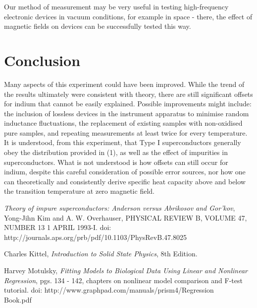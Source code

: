 \documentclass[aps,prl,nofootinbib,twocolumn,superscriptaddress,groupedaddress]{revtex4}  %
\begin{document}
Our method of measurement may be very useful in testing high-frequency electronic devices in vacuum conditions, for example in space - there, the effect of magnetic fields on devices can be successfully tested this way.

\section{Conclusion}

Many aspects of this experiment could have been improved. While the trend of the results ultimately were consistent with theory, there are still significant offsets for indium that cannot be easily explained. Possible improvements might include: the inclusion of lossless devices in the instrument apparatus to minimise random inductance fluctuations, the replacement of existing samples with non-oxidised pure samples, and repeating measurements at least twice for every temperature. It is understood, from this experiment, that Type I superconductors generally obey the distribution provided in (1), as well as the effect of impurities in superconductors. What is not understood is how offsets can still occur for indium, despite this careful consideration of possible error sources, nor how  one can theoretically and consistently derive specific heat capacity above and below the transition temperature at zero magnetic field. 


\begin{thebibliography}{99}

    \textit{Theory of impure superconductors: Anderson versus Abrikosov and Gor'kov}, Yong-Jihn Kim and A. W. Overhauser, PHYSICAL REVIEW B, VOLUME 47, NUMBER 13 1 APRIL 1993-I. doi: http://journals.aps.org/prb/pdf/10.1103/PhysRevB.47.8025
    
  Charles Kittel, \textit{Introduction to Solid State Physics}, 8th Edition.
  
  Harvey Motulsky, \textit{Fitting Models to Biological Data Using Linear and Nonlinear Regression}, pgs. 134 - 142, chapters on nonlinear model comparison and F-test tutorial. doi: http://www.graphpad.com/manuals/prism4/Regression\\Book.pdf

\end{thebibliography}
\end{document}
